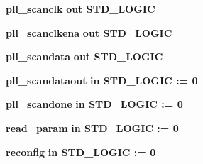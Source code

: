 \begin{DoxyCompactItemize}
\item 
{\bf pll\+\_\+scanclk}  {\bfseries {\bfseries \textcolor{keywordflow}{out}\textcolor{vhdlchar}{ }}} {\bfseries \textcolor{comment}{S\+T\+D\+\_\+\+L\+O\+G\+IC}\textcolor{vhdlchar}{ }} 
\item 
{\bf pll\+\_\+scanclkena}  {\bfseries {\bfseries \textcolor{keywordflow}{out}\textcolor{vhdlchar}{ }}} {\bfseries \textcolor{comment}{S\+T\+D\+\_\+\+L\+O\+G\+IC}\textcolor{vhdlchar}{ }} 
\item 
{\bf pll\+\_\+scandata}  {\bfseries {\bfseries \textcolor{keywordflow}{out}\textcolor{vhdlchar}{ }}} {\bfseries \textcolor{comment}{S\+T\+D\+\_\+\+L\+O\+G\+IC}\textcolor{vhdlchar}{ }} 
\item 
{\bf pll\+\_\+scandataout}  {\bfseries {\bfseries \textcolor{keywordflow}{in}\textcolor{vhdlchar}{ }}} {\bfseries \textcolor{comment}{S\+T\+D\+\_\+\+L\+O\+G\+IC}\textcolor{vhdlchar}{ }\textcolor{vhdlchar}{ }\textcolor{vhdlchar}{\+:}\textcolor{vhdlchar}{=}\textcolor{vhdlchar}{ }\textcolor{vhdlchar}{ }\textcolor{vhdlchar}{\textquotesingle{}}\textcolor{vhdlchar}{ } \textcolor{vhdldigit}{0} \textcolor{vhdlchar}{ }\textcolor{vhdlchar}{\textquotesingle{}}\textcolor{vhdlchar}{ }} 
\item 
{\bf pll\+\_\+scandone}  {\bfseries {\bfseries \textcolor{keywordflow}{in}\textcolor{vhdlchar}{ }}} {\bfseries \textcolor{comment}{S\+T\+D\+\_\+\+L\+O\+G\+IC}\textcolor{vhdlchar}{ }\textcolor{vhdlchar}{ }\textcolor{vhdlchar}{\+:}\textcolor{vhdlchar}{=}\textcolor{vhdlchar}{ }\textcolor{vhdlchar}{ }\textcolor{vhdlchar}{\textquotesingle{}}\textcolor{vhdlchar}{ } \textcolor{vhdldigit}{0} \textcolor{vhdlchar}{ }\textcolor{vhdlchar}{\textquotesingle{}}\textcolor{vhdlchar}{ }} 
\item 
{\bf read\+\_\+param}  {\bfseries {\bfseries \textcolor{keywordflow}{in}\textcolor{vhdlchar}{ }}} {\bfseries \textcolor{comment}{S\+T\+D\+\_\+\+L\+O\+G\+IC}\textcolor{vhdlchar}{ }\textcolor{vhdlchar}{ }\textcolor{vhdlchar}{\+:}\textcolor{vhdlchar}{=}\textcolor{vhdlchar}{ }\textcolor{vhdlchar}{ }\textcolor{vhdlchar}{\textquotesingle{}}\textcolor{vhdlchar}{ } \textcolor{vhdldigit}{0} \textcolor{vhdlchar}{ }\textcolor{vhdlchar}{\textquotesingle{}}\textcolor{vhdlchar}{ }} 
\item 
{\bf reconfig}  {\bfseries {\bfseries \textcolor{keywordflow}{in}\textcolor{vhdlchar}{ }}} {\bfseries \textcolor{comment}{S\+T\+D\+\_\+\+L\+O\+G\+IC}\textcolor{vhdlchar}{ }\textcolor{vhdlchar}{ }\textcolor{vhdlchar}{\+:}\textcolor{vhdlchar}{=}\textcolor{vhdlchar}{ }\textcolor{vhdlchar}{ }\textcolor{vhdlchar}{\textquotesingle{}}\textcolor{vhdlchar}{ } \textcolor{vhdldigit}{0} \textcolor{vhdlchar}{ }\textcolor{vhdlchar}{\textquotesingle{}}\textcolor{vhdlchar}{ }} 

\end{DoxyCompactItemize}

